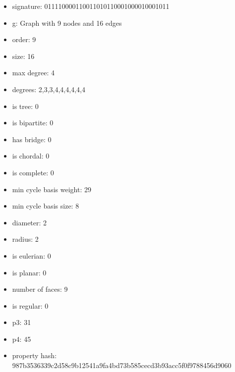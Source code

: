 \begin{figure}
\end{figure}
\begin{itemize}
\item signature: 011110000110011010110001000010001011
\item g: Graph with 9 nodes and 16 edges
\item order: 9
\item size: 16
\item max degree: 4
\item degrees: 2,3,3,4,4,4,4,4,4
\item is tree: 0
\item is bipartite: 0
\item has bridge: 0
\item is chordal: 0
\item is complete: 0
\item min cycle basis weight: 29
\item min cycle basis size: 8
\item diameter: 2
\item radius: 2
\item is eulerian: 0
\item is planar: 0
\item number of faces: 9
\item is regular: 0
\item p3: 31
\item p4: 45
\item property hash: 987b3536339c2d58c9b12541a9fa4bd73b585cecd3b93acc5f0f9788456d9060
\end{itemize}
